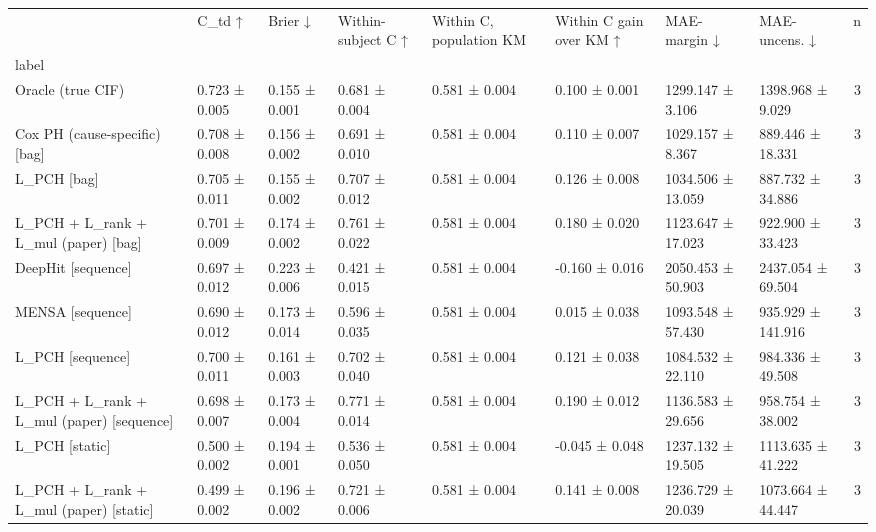 \begin{tabular}{llllllllr}
\toprule
 & C\_td ↑ & Brier ↓ & Within-subject C ↑ & Within C, population KM & Within C gain over KM ↑ & MAE-margin ↓ & MAE-uncens. ↓ & n \\
label &  &  &  &  &  &  &  &  \\
\midrule
Oracle (true CIF) & 0.723 ± 0.005 & 0.155 ± 0.001 & 0.681 ± 0.004 & 0.581 ± 0.004 & 0.100 ± 0.001 & 1299.147 ± 3.106 & 1398.968 ± 9.029 & 3 \\
Cox PH (cause-specific) [bag] & 0.708 ± 0.008 & 0.156 ± 0.002 & 0.691 ± 0.010 & 0.581 ± 0.004 & 0.110 ± 0.007 & 1029.157 ± 8.367 & 889.446 ± 18.331 & 3 \\
L\_PCH [bag] & 0.705 ± 0.011 & 0.155 ± 0.002 & 0.707 ± 0.012 & 0.581 ± 0.004 & 0.126 ± 0.008 & 1034.506 ± 13.059 & 887.732 ± 34.886 & 3 \\
L\_PCH + L\_rank + L\_mul (paper) [bag] & 0.701 ± 0.009 & 0.174 ± 0.002 & 0.761 ± 0.022 & 0.581 ± 0.004 & 0.180 ± 0.020 & 1123.647 ± 17.023 & 922.900 ± 33.423 & 3 \\
DeepHit [sequence] & 0.697 ± 0.012 & 0.223 ± 0.006 & 0.421 ± 0.015 & 0.581 ± 0.004 & -0.160 ± 0.016 & 2050.453 ± 50.903 & 2437.054 ± 69.504 & 3 \\
MENSA [sequence] & 0.690 ± 0.012 & 0.173 ± 0.014 & 0.596 ± 0.035 & 0.581 ± 0.004 & 0.015 ± 0.038 & 1093.548 ± 57.430 & 935.929 ± 141.916 & 3 \\
L\_PCH [sequence] & 0.700 ± 0.011 & 0.161 ± 0.003 & 0.702 ± 0.040 & 0.581 ± 0.004 & 0.121 ± 0.038 & 1084.532 ± 22.110 & 984.336 ± 49.508 & 3 \\
L\_PCH + L\_rank + L\_mul (paper) [sequence] & 0.698 ± 0.007 & 0.173 ± 0.004 & 0.771 ± 0.014 & 0.581 ± 0.004 & 0.190 ± 0.012 & 1136.583 ± 29.656 & 958.754 ± 38.002 & 3 \\
L\_PCH [static] & 0.500 ± 0.002 & 0.194 ± 0.001 & 0.536 ± 0.050 & 0.581 ± 0.004 & -0.045 ± 0.048 & 1237.132 ± 19.505 & 1113.635 ± 41.222 & 3 \\
L\_PCH + L\_rank + L\_mul (paper) [static] & 0.499 ± 0.002 & 0.196 ± 0.002 & 0.721 ± 0.006 & 0.581 ± 0.004 & 0.141 ± 0.008 & 1236.729 ± 20.039 & 1073.664 ± 44.447 & 3 \\
\bottomrule
\end{tabular}
